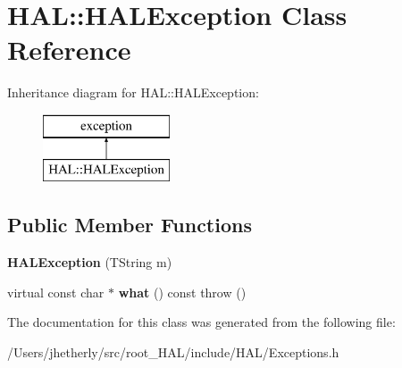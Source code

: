 \hypertarget{class_h_a_l_1_1_h_a_l_exception}{\section{H\+A\+L\+:\+:H\+A\+L\+Exception Class Reference}
\label{class_h_a_l_1_1_h_a_l_exception}
}
Inheritance diagram for H\+A\+L\+:\+:H\+A\+L\+Exception\+:\begin{figure}[H]
\begin{center}
\leavevmode
\includegraphics[height=2.000000cm]{class_h_a_l_1_1_h_a_l_exception}
\end{center}
\end{figure}
\subsection*{Public Member Functions}
\begin{DoxyCompactItemize}
\item 
\hypertarget{class_h_a_l_1_1_h_a_l_exception_a4f6662db7819d278a642abc8edf6b064}{{\bfseries H\+A\+L\+Exception} (T\+String m)}\label{class_h_a_l_1_1_h_a_l_exception_a4f6662db7819d278a642abc8edf6b064}

\item 
\hypertarget{class_h_a_l_1_1_h_a_l_exception_aaf6b8a29e7bb09721dd7aaa7b7a9b078}{virtual const char $\ast$ {\bfseries what} () const   throw ()}\label{class_h_a_l_1_1_h_a_l_exception_aaf6b8a29e7bb09721dd7aaa7b7a9b078}

\end{DoxyCompactItemize}


The documentation for this class was generated from the following file\+:\begin{DoxyCompactItemize}
\item 
/\+Users/jhetherly/src/root\+\_\+\+H\+A\+L/include/\+H\+A\+L/Exceptions.\+h\end{DoxyCompactItemize}
